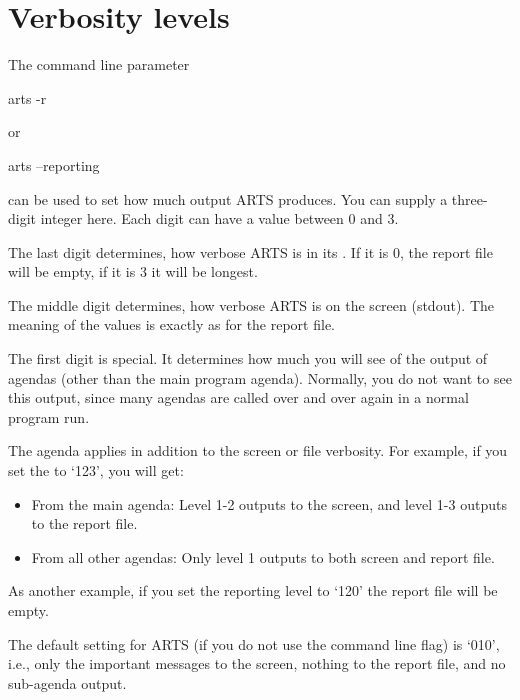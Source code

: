 \section{Verbosity levels}

The command line parameter 
\begin{code}
  arts -r
\end{code}
or
\begin{code}
  arts --reporting
\end{code}
can be used to set how much output ARTS produces. You can supply a
three-digit integer here. Each digit can have a value between 0 and 3.

The last digit determines, how verbose ARTS is in its
. If it is 0, the report file will be empty, if
it is 3 it will be longest.

The middle digit determines, how verbose ARTS is on the screen
(stdout). The meaning of the values is exactly as for the report
file. 

The first digit is special. It determines how much you will see of the
output of agendas (other than the main program agenda). Normally, you
do not want to see this output, since many agendas are called over and
over again in a normal program run. 

The agenda  applies in addition to the screen or
file verbosity. For example, if you set the  to `123', you will get:
\begin{itemize}
\item From the main agenda: Level 1-2 outputs to the screen, and level
  1-3 outputs to the report file.
\item From all other agendas: Only level 1 outputs to both screen and
  report file.
\end{itemize}
As another example, if you set the reporting level to `120' the
report file will be empty.

The default setting for ARTS (if you do not use the command line flag)
is `010', i.e., only the important messages to the screen, nothing to
the report file, and no sub-agenda output.


